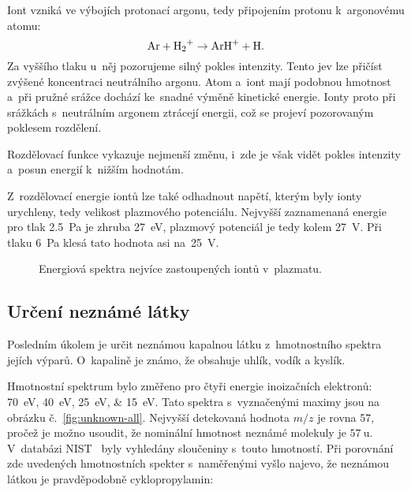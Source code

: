\documentclass{protokol}
\newcommand\mz{m/z}
\begin{document}
Iont  vzniká ve výbojích protonací argonu, tedy připojením
protonu k~argonovému atomu:
\begin{equation}
	\label{eq:arh}
	\ce{Ar} + \ce{H2+} \rightarrow \ce{ArH+} + \ce{H}.
\end{equation}
Za vyššího tlaku u~něj pozorujeme silný pokles intenzity.
Tento jev lze přičíst zvýšené koncentraci neutrálního argonu.
Atom  a~iont  mají podobnou hmotnost a~při pružné srážce
dochází ke~snadné výměně kinetické energie.
Ionty proto při srážkách s~neutrálním argonem ztrácejí energii,
což se projeví pozorovaným poklesem rozdělení.

Rozdělovací funkce  vykazuje nejmenší změnu,
i~zde je však vidět pokles intenzity a~posun energií k~nižším hodnotám.

Z~rozdělovací energie iontů lze také odhadnout napětí, kterým byly ionty
urychleny, tedy velikost plazmového potenciálu.
Nejvyšší zaznamenaná energie pro tlak \SI{2.5}{\pascal} je zhruba
\SI{27}{\electronvolt}, plazmový potenciál je tedy kolem \SI{27}{\volt}.
Při tlaku \SI{6}{\pascal} klesá tato hodnota asi na~\SI{25}{\volt}.

\begin{figure}[htp]
	\centering
	
	
	\caption{Energiová spektra nejvíce zastoupených iontů v~plazmatu.}
	\label{fig:energy}
\end{figure}

\subsection{Určení neznámé látky}
\label{sec:unknown}
Posledním úkolem je určit neznámou kapalnou látku z~hmotnostního spektra
jejích výparů.
O~kapalině je známo, že obsahuje uhlík, vodík a kyslík.

Hmotnostní spektrum bylo změřeno pro čtyři energie inoizačních elektronů:
\SIlist[list-separator={, }]{70;40;25;15}{\electronvolt}.
Tato spektra s~vyznačenými maximy jsou na obrázku č.~\ref{fig:unknown-all}.
Nejvyšší detekovaná hodnota $\mz$ je rovna \SI{57}{\thomson},
pročež je možno usoudit, že nominální hmotnost neznámé molekuly
je $\SI{57}{\amu}$.
V~databázi NIST~\parencite{nist} byly vyhledány sloučeniny s~touto hmotností.
Při porovnání zde uvedených hmotnostních spekter s~naměřenými vyšlo najevo,
že neznámou látkou je pravděpodobně cyklopropylamin:
\begin{center}
\end{center}
\end{document}
